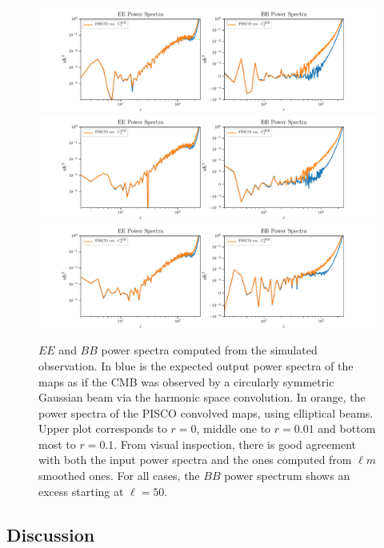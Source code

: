 \documentclass[a4paper,fleqn]{cas-dc}\sloppy
\begin{document}
\begin{figure}
	\centering
	\includegraphics[width=1.0\linewidth]{figures/CLASS_scan_7_20_elliptical_gussian_beams_r_0d00.pdf}
	\includegraphics[width=1.0\linewidth]{figures/CLASS_scan_7_20_elliptical_gussian_beams_r_0d01.pdf}
	\includegraphics[width=1.0\linewidth]{figures/CLASS_scan_7_20_elliptical_gussian_beams_r_0d10.pdf}
	\caption{$EE$ and $BB$ power spectra computed from the simulated observation. In blue is the expected output power spectra of the maps as if the CMB was observed by a circularly symmetric Gaussian beam via the harmonic space convolution. In orange, the power spectra of the PISCO convolved maps, using elliptical beams. Upper plot corresponds to $r=0$, middle one to $r=0.01$ and bottom most to $r=0.1$. From visual inspection, there is good agreement with both the input power spectra and the ones computed from $\ell m$ smoothed ones. For all cases, the $BB$ power spectrum shows an excess starting at $\ell = 50$.}
	\label{fig::piscoclasssim}
\end{figure}

\subsection{Discussion}
\end{document}
